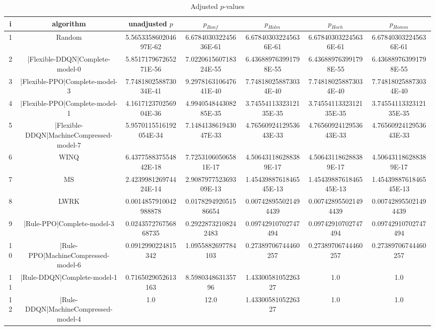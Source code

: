 \documentclass[a3paper,10pt]{article}
\begin{document}
\begin{table}[!htp]
\centering\tiny
\caption{Adjusted $p$-values}
\begin{tabular}{ccccccc}
i&algorithm&unadjusted $p$&$p_{Bonf}$&$p_{Holm}$&$p_{Hoch}$&$p_{Homm}$\\
\hline
1&Random&5.565335860204697E-62&6.678403032245636E-61&6.678403032245636E-61&6.678403032245636E-61&6.678403032245636E-61\\
2&|Flexible-DDQN|Complete-model-0&5.851717967265271E-56&7.022061560718324E-55&6.436889763991798E-55&6.436889763991798E-55&6.436889763991798E-55\\
3&|Flexible-PPO|Complete-model-3&7.748180258873034E-41&9.297816310647641E-40&7.748180258873034E-40&7.748180258873034E-40&7.748180258873034E-40\\
4&|Flexible-PPO|Complete-model-1&4.161712370256904E-36&4.994054844308285E-35&3.7455411332312135E-35&3.7455411332312135E-35&3.7455411332312135E-35\\
5&|Flexible-DDQN|MachineCompressed-model-7&5.9570115516192054E-34&7.148413861943047E-33&4.7656092412953643E-33&4.7656092412953643E-33&4.7656092412953643E-33\\
6&WINQ&6.437758837554842E-18&7.72531060506581E-17&4.506431186288389E-17&4.506431186288389E-17&4.506431186288389E-17\\
7&MS&2.423998126974424E-14&2.908797752369309E-13&1.4543988761846545E-13&1.4543988761846545E-13&1.4543988761846545E-13\\
8&LWRK&0.0014857910042988878&0.017829492051586654&0.007428955021494439&0.007428955021494439&0.007428955021494439\\
9&|Rule-PPO|Complete-model-3&0.024357276756868735&0.29228732108242483&0.09742910702747494&0.09742910702747494&0.09742910702747494\\
10&|Rule-PPO|MachineCompressed-model-6&0.0912990224815342&1.0955882697784103&0.27389706744460257&0.27389706744460257&0.27389706744460257\\
11&|Rule-DDQN|Complete-model-1&0.7165029052613163&8.598034863135796&1.4330058105226327&1.0&1.0\\
12&|Rule-DDQN|MachineCompressed-model-4&1.0&12.0&1.4330058105226327&1.0&1.0\\
\hline
\end{tabular}
\end{table}
\end{document}

